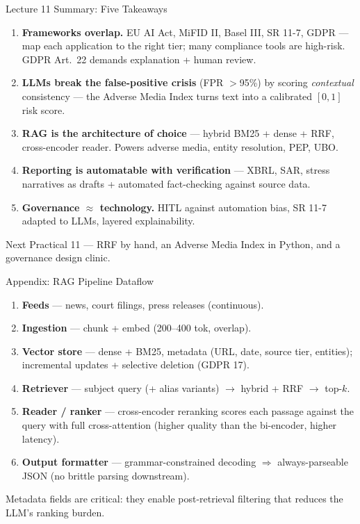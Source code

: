 \documentclass[9pt,t]{beamer}
\begin{document}
\begin{frame}{Lecture 11 Summary: Five Takeaways}
\begin{enumerate}
  \item \textbf{Frameworks overlap.} EU AI Act, MiFID II, Basel III, SR 11-7,
        GDPR --- map each application to the right tier; many compliance tools are
        high-risk. GDPR Art.\ 22 demands explanation + human review.
  \item \textbf{LLMs break the false-positive crisis} (FPR $>$95\%) by scoring
        \emph{contextual} consistency --- the Adverse Media Index turns text into a
        calibrated $[0,1]$ risk score.
  \item \textbf{RAG is the architecture of choice} --- hybrid BM25 + dense + RRF,
        cross-encoder reader. Powers adverse media, entity resolution, PEP, UBO.
  \item \textbf{Reporting is automatable with verification} --- XBRL, SAR, stress
        narratives as drafts + automated fact-checking against source data.
  \item \textbf{Governance $\approx$ technology.} HITL against automation bias,
        SR 11-7 adapted to LLMs, layered explainability.
\end{enumerate}

\medskip
\begin{block}{Next}
Practical 11 --- RRF by hand, an Adverse Media Index in Python, and a governance
design clinic.
\end{block}
\end{frame}


\begin{frame}[noframenumbering]{Appendix: RAG Pipeline Dataflow}
\small
\begin{enumerate}
  \item \textbf{Feeds} --- news, court filings, press releases (continuous).
  \item \textbf{Ingestion} --- chunk + embed (200--400 tok, overlap).
  \item \textbf{Vector store} --- dense + BM25, metadata (URL, date, source tier,
        entities); incremental updates + selective deletion (GDPR 17).
  \item \textbf{Retriever} --- subject query (+ alias variants) $\to$ hybrid + RRF
        $\to$ top-$k$.
  \item \textbf{Reader / ranker} --- cross-encoder reranking scores each passage
        against the query with full cross-attention (higher quality than the
        bi-encoder, higher latency).
  \item \textbf{Output formatter} --- grammar-constrained decoding $\Rightarrow$
        always-parseable JSON (no brittle parsing downstream).
\end{enumerate}

\medskip
Metadata fields are critical: they enable post-retrieval filtering that reduces
the LLM's ranking burden.
\end{frame}
\end{document}
